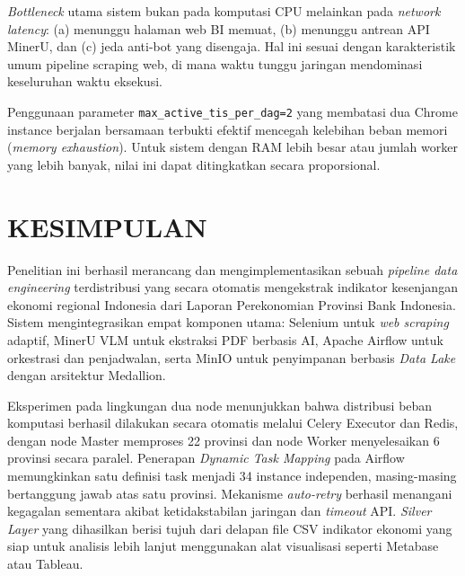 \documentclass[10pt, a4paper, twocolumn]{article}
\begin{document}
\textit{Bottleneck} utama sistem bukan pada komputasi CPU melainkan pada \textit{network latency}: (a) menunggu halaman web BI memuat, (b) menunggu antrean API MinerU, dan (c) jeda anti-bot yang disengaja. Hal ini sesuai dengan karakteristik umum pipeline scraping web, di mana waktu tunggu jaringan mendominasi keseluruhan waktu eksekusi.

Penggunaan parameter \texttt{max\_active\_tis\_per\_dag=2} yang membatasi dua Chrome instance berjalan bersamaan terbukti efektif mencegah kelebihan beban memori (\textit{memory exhaustion}). Untuk sistem dengan RAM lebih besar atau jumlah worker yang lebih banyak, nilai ini dapat ditingkatkan secara proporsional.

\section{KESIMPULAN}

Penelitian ini berhasil merancang dan mengimplementasikan sebuah \textit{pipeline data engineering} terdistribusi yang secara otomatis mengekstrak indikator kesenjangan ekonomi regional Indonesia dari Laporan Perekonomian Provinsi Bank Indonesia. Sistem mengintegrasikan empat komponen utama: Selenium untuk \textit{web scraping} adaptif, MinerU VLM untuk ekstraksi PDF berbasis AI, Apache Airflow untuk orkestrasi dan penjadwalan, serta MinIO untuk penyimpanan berbasis \textit{Data Lake} dengan arsitektur Medallion.

Eksperimen pada lingkungan dua node menunjukkan bahwa distribusi beban komputasi berhasil dilakukan secara otomatis melalui Celery Executor dan Redis, dengan node Master memproses 22 provinsi dan node Worker menyelesaikan 6 provinsi secara paralel. Penerapan \textit{Dynamic Task Mapping} pada Airflow memungkinkan satu definisi task menjadi 34 instance independen, masing-masing bertanggung jawab atas satu provinsi. Mekanisme \textit{auto-retry} berhasil menangani kegagalan sementara akibat ketidakstabilan jaringan dan \textit{timeout} API. \textit{Silver Layer} yang dihasilkan berisi tujuh dari delapan file CSV indikator ekonomi yang siap untuk analisis lebih lanjut menggunakan alat visualisasi seperti Metabase atau Tableau.
\end{document}
